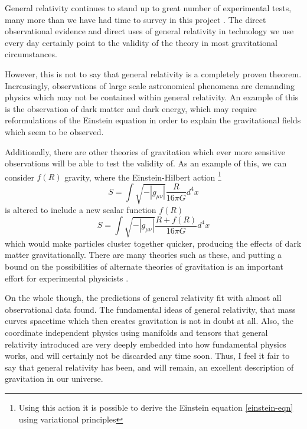 
General relativity continues to stand up to great number of experimental tests, many more than we have had time to survey in this project \cite{lrr-2006-3}. The direct observational evidence and direct uses of general relativity in technology we use every day certainly point to the validity of the theory in most gravitational circumstances.

However, this is not to say that general relativity is a completely proven theorem. Increasingly, observations of large scale astronomical phenomena are demanding physics which may not be contained within general relativity. An example of this is the observation of dark matter and dark energy, which may require reformulations of the Einstein equation in order to explain the gravitational fields which seem to be observed.

Additionally, there are other theories of gravitation which ever more sensitive observations will be able to test the validity of. As an example of this, we can consider \(f(R)\) gravity, where the Einstein-Hilbert action \footnote{Using this action it is possible to derive the Einstein equation \eqref{einstein-eqn} using variational principles}
\begin{equation}
	S = \int \sqrt{- |g_{\mu \nu}|} \frac{R}{16 \pi G} d^4 x
\end{equation}
is altered to include a new scalar function \(f(R)\) \cite{li, lrr-2010-3}
\begin{equation}
	S = \int \sqrt{- |g_{\mu \nu}|} \frac{R + f(R)}{16 \pi G} d^4 x
\end{equation}
which would make particles cluster together quicker, producing the effects of dark matter gravitationally. There are many theories such as these, and putting a bound on the possibilities of alternate theories of gravitation is an important effort for experimental physicists \cite{lrr-2006-3}. 

On the whole though, the predictions of general relativity fit with almost all observational data found. The fundamental ideas of general relativity, that mass curves spacetime which then creates gravitation is not in doubt at all. Also, the coordinate independent physics using manifolds and tensors that general relativity introduced are very deeply embedded into how fundamental physics works, and will certainly not be discarded any time soon. Thus, I feel it fair to say that general relativity has been, and will remain, an excellent description of gravitation in our universe.